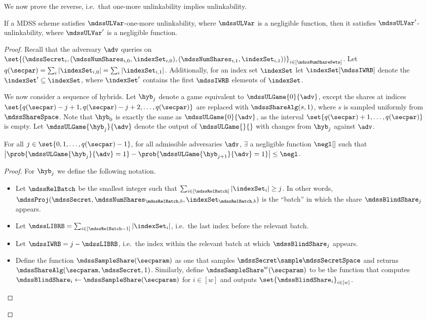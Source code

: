 We now prove the reverse, i.e.\ that one-more unlinkability implies unlinkability.
\begin{theorem}
	If a MDSS scheme satisfies $\mdssULVar$-one-more unlinkability, where $\mdssULVar$ is a negligible function, then it satisfies $\mdssULVar'$-unlinkability, where $\mdssULVar'$ is a negligible function.
\end{theorem}

\begin{proof}

	Recall that the adversary $\adv$ queries on $\set{(\mdssSecret_i, (\mdssNumShares_{i, 0},\indexSet_{i, 0}), (\mdssNumShares_{i, 1}, \indexSet_{i, 1}))}_{i \in [\mdssNumShareSets]}$.
	Let $q(\secpar) = \sum_i |\indexSet_{i, 0}| = \sum_i |\indexSet_{i, 1}|$.
	Additionally, for an index set $\indexSet$ let $\indexSet[\mdssIWRB]$ denote the $\indexSet' \subseteq \indexSet$, where $\indexSet'$ contains the first $\mdssIWRB$ elements of $\indexSet$.


	We now consider a sequence of hybrids.
	Let $\hyb_j$ denote a game equivalent to $\mdssULGame{0}{\adv}$, except the shares at indices $\set{q(\secpar) - j + 1, q(\secpar) - j + 2, \dots, q(\secpar)}$ are replaced with $\mdssShareAlg(s, 1)$, where $s$ is sampled uniformly from $\mdssShareSpace$.
	Note that $\hyb_0$ is exactly the same as $\mdssULGame{0}{\adv}$, as the interval $\set{q(\secpar) + 1, \dots, q(\secpar)}$ is empty.
	Let $\mdssULGame{\hyb_j}{\adv}$ denote the output of $\mdssULGame{}{}$ with changes from $\hyb_j$ against $\adv$.

	\begin{claim}
		For all $j \in \set{0, 1, \dots, q(\secpar) - 1}$, for all admissible adversaries $\adv$, $\exists$ a negligible function $\negl[]$ such that $\left| \prob{\mdssULGame{\hyb_j}{\adv} = 1} - \prob{\mdssULGame{\hyb_{j + 1}}{\adv} = 1} \right| \leq \negl$.
	\end{claim}

	\begin{proof}
		For $\hyb_j$ we define the following notation.
		\begin{itemize}
			\item Let $\mdssRelBatch$ be the smallest integer such that $\sum_{i \in [\mdssRelBatch]} |\indexSet_i| \geq j$. In other words, $\mdssProj(\mdssSecret, \mdssNumShares_{\mdssRelBatch, b}, \indexSet_{\mdssRelBatch, b})$ is the ``batch'' in which the share $\mdssBlindShare_j$ appears.
			\item Let $\mdssLIBRB = \sum_{i \in [\mdssRelBatch - 1]} |\indexSet_i|$, i.e.\ the last index before the relevant batch.
			\item Let $\mdssIWRB = j - \mdssLIBRB$, i.e.\ the index within the relevant batch at which $\mdssBlindShare_j$ appears.
			\item Define the function $\mdssSampleShare(\secparam)$ as one that samples $\mdssSecret \sample \mdssSecretSpace$ and returns $\mdssShareAlg(\secparam, \mdssSecret, 1)$.
			      Similarly, define $\mdssSampleShare^w(\secparam)$ to be the function that computes $\mdssBlindShare_i \gets \mdssSampleShare(\secparam)$ for $i \in [w]$ and outputs $\set{\mdssBlindShare_i}_{i \in [w]}$.
		\end{itemize}


\end{proof}
\end{proof}
